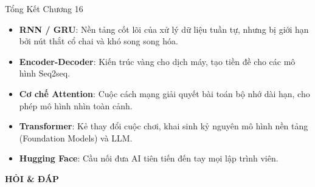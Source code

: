 \documentclass[aspectratio=169, 12pt]{beamer}
\begin{document}
\begin{frame}{Tổng Kết Chương 16}
    \begin{itemize}
        \item \textbf{RNN / GRU}: Nền tảng cốt lõi của xử lý dữ liệu tuần tự, nhưng bị giới hạn bởi nút thắt cổ chai và khó song song hóa.
        \item \textbf{Encoder-Decoder}: Kiến trúc vàng cho dịch máy, tạo tiền đề cho các mô hình Seq2seq.
        \item \textbf{Cơ chế Attention}: Cuộc cách mạng giải quyết bài toán bộ nhớ dài hạn, cho phép mô hình nhìn toàn cảnh.
        \item \textbf{Transformer}: Kẻ thay đổi cuộc chơi, khai sinh kỷ nguyên mô hình nền tảng (Foundation Models) và LLM.
        \item \textbf{Hugging Face}: Cầu nối đưa AI tiên tiến đến tay mọi lập trình viên.
    \end{itemize}
\end{frame}

\begin{frame}
    \centering
    \Huge \textbf{HỎI \& ĐÁP}
\end{frame}
\end{document}
